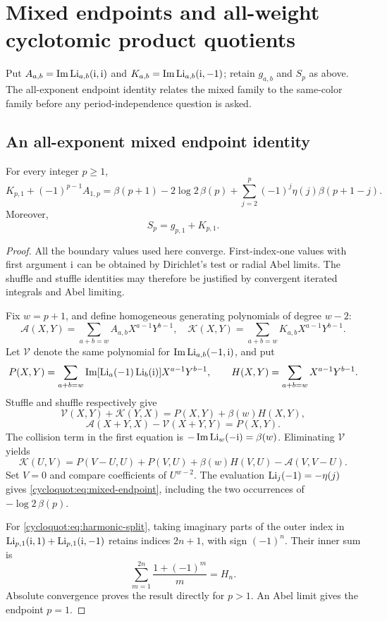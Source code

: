 \section{Mixed endpoints and all-weight cyclotomic product quotients}
Put $A_{a,b}=\operatorname{Im}\operatorname{Li}_{a,b}(\mathrm{i},\mathrm{i})$ and
$K_{a,b}=\operatorname{Im}\operatorname{Li}_{a,b}(\mathrm{i},-1)$; retain $g_{a,b}$ and $S_p$ as above.
The all-exponent endpoint identity relates the mixed family to the same-color
family before any period-independence question is asked.

\subsection{An all-exponent mixed endpoint identity}

\begin{theorem}\label{cycloquot:thm:mixed-endpoint}
For every integer \(p\geq1\),
\begin{equation}\label{cycloquot:eq:mixed-endpoint}
 K_{p,1}+(-1)^{p-1}A_{1,p}
 =\beta(p+1)-2\log2\,\beta(p)
       +\sum_{j=2}^{p}(-1)^j\eta(j)\beta(p+1-j).
\end{equation}
Moreover,
\begin{equation}\label{cycloquot:eq:harmonic-split}
 S_p=g_{p,1}+K_{p,1}.
\end{equation}
\end{theorem}

\begin{proof}
All the boundary values used here converge. First-index-one values
with first argument \(\mathrm{i}\) can be obtained by Dirichlet's test or
radial Abel limits. The shuffle and stuffle identities may therefore
be justified by convergent iterated integrals and Abel limiting.

Fix \(w=p+1\), and define homogeneous generating polynomials of
degree \(w-2\):
\[
 \mathcal A(X,Y)=\sum_{a+b=w}A_{a,b}X^{a-1}Y^{b-1},
 \quad
 \mathcal K(X,Y)=\sum_{a+b=w}K_{a,b}X^{a-1}Y^{b-1}.
\]
Let \(\mathcal V\) denote the same polynomial for
\(\operatorname{Im}\operatorname{Li}_{a,b}(-1,\mathrm{i})\), and put
\[
 P(X,Y)=\sum_{a+b=w}
  \operatorname{Im}[\operatorname{Li}_a(-1)\operatorname{Li}_b(\mathrm{i})]X^{a-1}Y^{b-1},
 \qquad
 H(X,Y)=\sum_{a+b=w}X^{a-1}Y^{b-1}.
\]
Stuffle and shuffle respectively give
\[
 \mathcal V(X,Y)+\mathcal K(Y,X)=P(X,Y)+\beta(w)H(X,Y),
\]
\[
 \mathcal A(X+Y,X)-\mathcal V(X+Y,Y)=P(X,Y).
\]
The collision term in the first equation is
\(-\operatorname{Im}\operatorname{Li}_w(-\mathrm{i})=\beta(w)\).
Eliminating \(\mathcal V\) yields
\[
 \mathcal K(U,V)=P(V-U,U)+P(V,U)+\beta(w)H(V,U)
                  -\mathcal A(V,V-U).
\]
Set \(V=0\) and compare coefficients of \(U^{w-2}\).
The evaluation \(\operatorname{Li}_j(-1)=-\eta(j)\) gives
\eqref{cycloquot:eq:mixed-endpoint}, including the two occurrences of
\(-\log2\,\beta(p)\).

For \eqref{cycloquot:eq:harmonic-split}, taking imaginary parts of the outer
index in \(\operatorname{Li}_{p,1}(\mathrm{i},1)+\operatorname{Li}_{p,1}(\mathrm{i},-1)\) retains indices
\(2n+1\), with sign \((-1)^n\). Their inner sum is
\[
 \sum_{m=1}^{2n}\frac{1+(-1)^m}{m}=H_n.
\]
Absolute convergence proves the result directly for \(p>1\).
An Abel limit gives the endpoint \(p=1\).
\end{proof}

